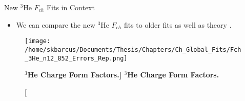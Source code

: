 \documentclass[10pt]{beamer}
\begin{document}
\begin{frame}[fragile]{New $^3$He $F_{ch}$ Fits in Context}

	\begin{itemize}
		\item We can compare the new $^3$He $F_{ch}$ fits to older fits as well as theory \cite{Article:Marcucci}.
	\end{itemize}
	
	\begin{figure}[!ht]
	\begin{center}
	\texttt{[image: /home/skbarcus/Documents/Thesis/Chapters/Ch\_Global\_Fits/Fch\_3He\_n12\_852\_Errors\_Rep.png]}
	\end{center}
	\caption[\bf{$^3$He Charge Form Factors.}]{
	{\bf{$^3$He Charge Form Factors.}} }
	\label{fig:3he_fch}
	\end{figure}

\end{frame}
\end{document}
